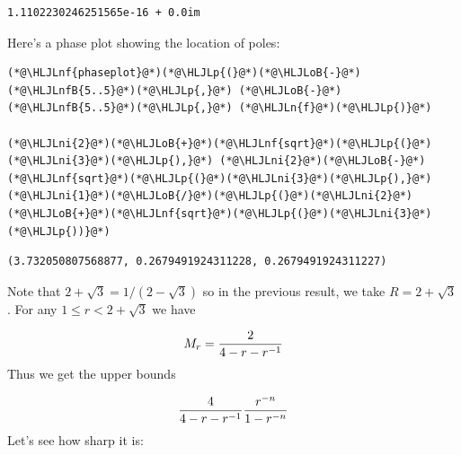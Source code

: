 \documentclass[12pt,a4paper]{article}
\newcommand{\HLJLn}[1]{#1}
\newcommand{\HLJLnf}[1]{\textcolor[RGB]{66,102,213}{#1}}
\newcommand{\HLJLnfB}[1]{\textcolor[RGB]{59,151,46}{#1}}
\newcommand{\HLJLni}[1]{\textcolor[RGB]{59,151,46}{#1}}
\newcommand{\HLJLoB}[1]{\textcolor[RGB]{102,102,102}{\textbf{#1}}}
\newcommand{\HLJLp}[1]{#1}
\begin{document}
\begin{lstlisting}
1.1102230246251565e-16 + 0.0im
\end{lstlisting}


Here's a phase plot showing the location of poles:


\begin{lstlisting}
(*@\HLJLnf{phaseplot}@*)(*@\HLJLp{(}@*)(*@\HLJLoB{-}@*)(*@\HLJLnfB{5..5}@*)(*@\HLJLp{,}@*) (*@\HLJLoB{-}@*)(*@\HLJLnfB{5..5}@*)(*@\HLJLp{,}@*) (*@\HLJLn{f}@*)(*@\HLJLp{)}@*)

(*@\HLJLni{2}@*)(*@\HLJLoB{+}@*)(*@\HLJLnf{sqrt}@*)(*@\HLJLp{(}@*)(*@\HLJLni{3}@*)(*@\HLJLp{),}@*) (*@\HLJLni{2}@*)(*@\HLJLoB{-}@*) (*@\HLJLnf{sqrt}@*)(*@\HLJLp{(}@*)(*@\HLJLni{3}@*)(*@\HLJLp{),}@*) (*@\HLJLni{1}@*)(*@\HLJLoB{/}@*)(*@\HLJLp{(}@*)(*@\HLJLni{2}@*)(*@\HLJLoB{+}@*)(*@\HLJLnf{sqrt}@*)(*@\HLJLp{(}@*)(*@\HLJLni{3}@*)(*@\HLJLp{))}@*)
\end{lstlisting}

\begin{lstlisting}
(3.732050807568877, 0.2679491924311228, 0.2679491924311227)
\end{lstlisting}


Note that $2+\sqrt 3 = 1/(2-\sqrt 3)$ so in the previous result, we take $R = 2+\sqrt 3$. For any $1 \leq r < 2+\sqrt 3$ we have 

\[
M_r = {2 \over 4 - r - r^{-1}}
\]
Thus we get the upper bounds

\[
    {4 \over 4 - r - r^{-1}} {r^{-n} \over 1 - r^{-n}}
\]
Let's see how sharp it is:
\end{document}
